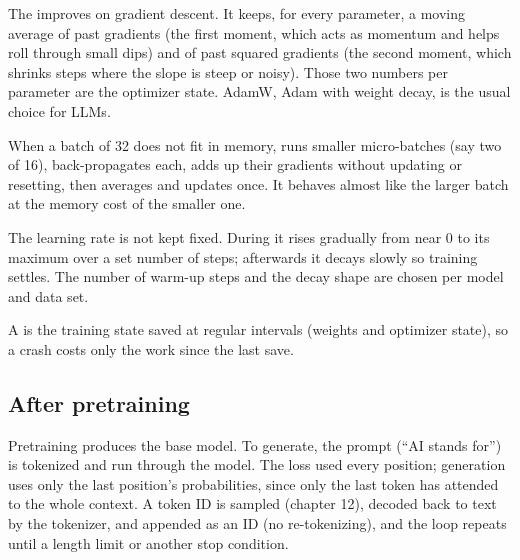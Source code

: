 \begin{definition}
The  improves on gradient descent. It keeps, for every parameter, a moving average of past gradients (the first moment, which acts as momentum and helps roll through small dips) and of past squared gradients (the second moment, which shrinks steps where the slope is steep or noisy). Those two numbers per parameter are the optimizer state. AdamW, Adam with weight decay, is the usual choice for LLMs.
\end{definition}

\begin{definition}
When a batch of 32 does not fit in memory,  runs smaller micro-batches (say two of 16), back-propagates each, adds up their gradients without updating or resetting, then averages and updates once. It behaves almost like the larger batch at the memory cost of the smaller one.
\end{definition}

\begin{definition}
The learning rate is not kept fixed. During  it rises gradually from near 0 to its maximum over a set number of steps; afterwards it decays slowly so training settles. The number of warm-up steps and the decay shape are chosen per model and data set.
\end{definition}

\begin{definition}
A  is the training state saved at regular intervals (weights and optimizer state), so a crash costs only the work since the last save.
\end{definition}

\subsection*{After pretraining}

\begin{remark}
Pretraining produces the base model. To generate, the prompt (``AI stands for'') is tokenized and run through the model. The loss used every position; generation uses only the last position's probabilities, since only the last token has attended to the whole context. A token ID is sampled (chapter 12), decoded back to text by the tokenizer, and appended as an ID (no re-tokenizing), and the loop repeats until a length limit or another stop condition.
\end{remark}

